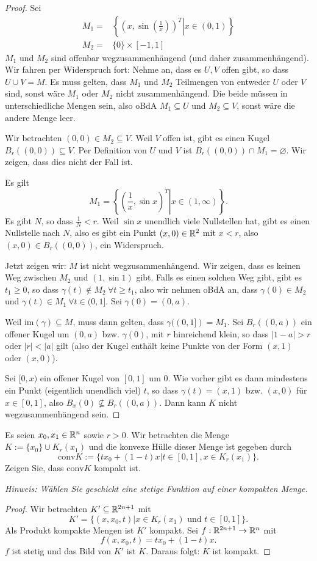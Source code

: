 \begin{proof}
	Sei
	\begin{align*}
		M_1=&\left\{ \left.\left( x,\sin\left( \frac{1}{x} \right)\right)^T \right|x\in (0,1)   \right\}\\
			M_2=& \{0\} \times [-1,1]\
	\end{align*}
	$M_1$ und $M_2$ sind offenbar wegzusammenhängend (und daher zusammenhängend). Wir fahren per Widerspruch fort: Nehme an, dass es $U,V$ offen gibt, so dass $U\cup V=M$. Es muss gelten, dass $M_1$ und $M_2$ Teilmengen von entweder $U$ oder $V$ sind, sonst wäre $M_1$ oder $M_2$ nicht zusammenhängend. Die beide müssen in unterschiedliche Mengen sein, also oBdA $M_1\subseteq U$ und $M_2\subseteq V$, sonst wäre die andere Menge leer.

	Wir betrachten $(0,0)\in M_2\subseteq V$. Weil $V$ offen ist, gibt es einen Kugel $B_r((0,0))\subseteq V$. Per Definition von $U$ und $V$ ist $B_r((0,0))\cap M_1=\varnothing$. Wir zeigen, dass dies nicht der Fall ist.
	
	Es gilt
	\[
	M_1=\left\{\left.\left( \frac{1}{x},\sin x \right)^T\right| x\in (1,\infty) \right\} 
	.\] 
	Es gibt $N$, so dass $\frac{1}{N}<r$. Weil $\sin x$ unendlich viele Nullstellen hat, gibt es einen Nullstelle nach $N$, also es gibt ein Punkt $(x,0)\in \mathbb{R}^2$ mit $x<r$, also $(x,0)\in B_r((0,0))$, ein Widerspruch.

	Jetzt zeigen wir: $M$ ist nicht wegzusammenhängend. Wir zeigen, dass es keinen Weg zwischen $M_2$ und $(1,\sin 1)$ gibt. Falls es einen solchen Weg gibt, gibt es $t_1\ge 0$, so dass $\gamma(t)\not\in M_2~\forall t\ge t_1$, also wir nehmen oBdA an, dass $\gamma(0)\in M_2$ und $\gamma(t)\in M_1~\forall t\in (0,1]$. Sei $\gamma(0)=(0,a)$.  

	Weil $\text{im}(\gamma)\subseteq M$, muss dann gelten, dass $\gamma((0,1])=M_1$. Sei $B_r((0,a))$ ein offener Kugel um $(0,a)$ bzw. $\gamma(0)$, mit $r$ hinreichend klein, so dass $|1-a|>r$ oder $|r|<|a|$ gilt (also der Kugel enthält keine Punkte von der Form $(x,1)$ oder $(x,0)$).

	Sei $[0,x)$ ein offener Kugel von $[0,1]$ um $0$. Wie vorher gibt es dann mindestens ein Punkt (eigentlich unendlich viel) $t$, so dass $\gamma(t)=(x,1)$ bzw. $(x,0)$ f\"{u}r $x\in [0,1]$, also $B_x(0)\not\subseteq B_r((0,a))$. Dann kann $K$ nicht wegzusammenhängend sein.
\end{proof}
\begin{Problem}
	Es seien $x_0,x_1\in \mathbb{R}^n$ sowie $r>0$. Wir betrachten die Menge $K:=\{x_0\} \cup K_r(x_1)$ und die konvexe Hülle dieser Menge ist gegeben durch
	\[
		\text{conv}K:=\{tx_0+(1-t)x|t\in [0,1],x\in K_r(x_1)\} 
	.\] 
	Zeigen Sie, dass $\text{conv}K$ kompakt ist.

	{\footnotesize\emph{Hinweis: Wählen Sie geschickt eine stetige Funktion auf einer kompakten Menge.}} 
\end{Problem}
\begin{proof}
	Wir betrachten $K'\subseteq\mathbb{R}^{2n+1}$ mit
	 \[
		 K'=\{(x,x_0,t)|x\in K_r(x_1)\text{ und }t\in [0,1]\} 
	.\] 
	Als Produkt kompakte Mengen ist $K'$ kompakt. Sei $f:\mathbb{R}^{2n+1}\to \mathbb{R}^n$ mit
	\[
	f(x,x_0,t)=tx_0+(1-t)x
	.\] 
	$f$ ist stetig und das Bild von $K'$ ist $K$. Daraus folgt: $K$ ist kompakt.
\end{proof}

